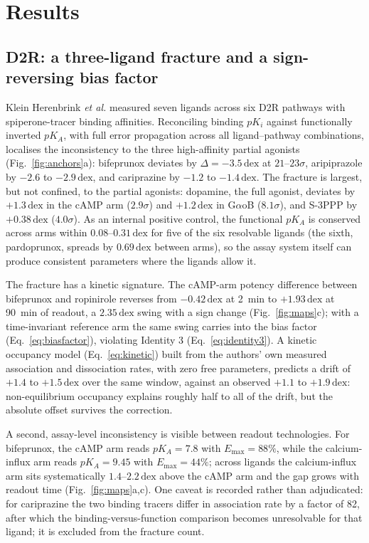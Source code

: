 ﻿\documentclass[11pt,a4paper]{article}
\newcommand{\dex}{\ensuremath{\,\mathrm{dex}}}
\newcommand{\pKA}{\ensuremath{p\!K_{\!A}}}
\newcommand{\pKi}{\ensuremath{p\!K_{i}}}
\newcommand{\Emax}{\ensuremath{E_{\max}}}
\begin{document}
\section{Results}

\subsection{D2R: a three-ligand fracture and a sign-reversing bias factor}
\label{sec:d2r}

Klein Herenbrink \emph{et al.} \cite{KleinHerenbrink2016} measured seven ligands across six D2R pathways with spiperone-tracer binding affinities. Reconciling binding $\pKi$ against functionally inverted $\pKA$, with full error propagation across all ligand--pathway combinations, localises the inconsistency to the three high-affinity partial agonists (Fig.~\ref{fig:anchors}a): bifeprunox deviates by $\Delta=-3.5\dex$ at $21$--$23\sigma$, aripiprazole by $-2.6$ to $-2.9\dex$, and cariprazine by $-1.2$ to $-1.4\dex$. The fracture is largest, but not confined, to the partial agonists: dopamine, the full agonist, deviates by $+1.3\dex$ in the cAMP arm ($2.9\sigma$) and $+1.2\dex$ in G$\alpha$oB ($8.1\sigma$), and S-3PPP by $+0.38\dex$ ($4.0\sigma$). As an internal positive control, the functional $\pKA$ is conserved across arms within $0.08$--$0.31\dex$ for five of the six resolvable ligands (the sixth, pardoprunox, spreads by $0.69\dex$ between arms), so the assay system itself can produce consistent parameters where the ligands allow it.

The fracture has a kinetic signature. The cAMP-arm potency difference between bifeprunox and ropinirole reverses from $-0.42\dex$ at 2~min to $+1.93\dex$ at 90~min of readout, a $2.35\dex$ swing with a sign change (Fig.~\ref{fig:maps}c); with a time-invariant reference arm the same swing carries into the bias factor (Eq.~\eqref{eq:biasfactor}), violating Identity 3 (Eq.~\eqref{eq:identity3}). A kinetic occupancy model (Eq.~\eqref{eq:kinetic}) built from the authors' own measured association and dissociation rates, with zero free parameters, predicts a drift of $+1.4$ to $+1.5\dex$ over the same window, against an observed $+1.1$ to $+1.9\dex$: non-equilibrium occupancy explains roughly half to all of the drift, but the absolute offset survives the correction.

A second, assay-level inconsistency is visible between readout technologies. For bifeprunox, the cAMP arm reads $\pKA=7.8$ with $\Emax=88\%$, while the calcium-influx arm reads $\pKA=9.45$ with $\Emax=44\%$; across ligands the calcium-influx arm sits systematically $1.4$--$2.2\dex$ above the cAMP arm and the gap grows with readout time (Fig.~\ref{fig:maps}a,c). One caveat is recorded rather than adjudicated: for cariprazine the two binding tracers differ in association rate by a factor of 82, after which the binding-versus-function comparison becomes unresolvable for that ligand; it is excluded from the fracture count.
\end{document}
